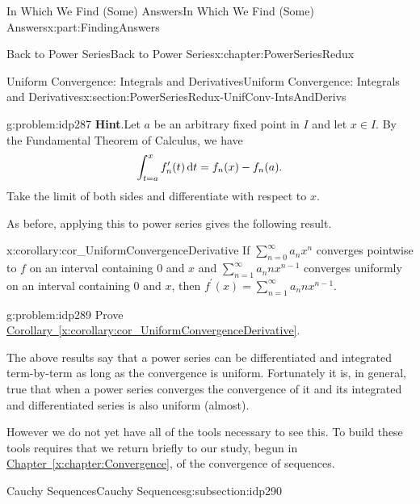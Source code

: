 \documentclass[oneside,10pt,]{book}
\newcommand{\blocktitlefont}{\relax}
\newcommand{\xreffont}{\relax}
\numberwithin{equation}{section}
\newcommand{\dx}[1]{\,{\rm d}#1}
\begin{document}
\begin{partptx}{In Which We Find (Some) Answers}{}{In Which We Find (Some) Answers}{}{}{x:part:FindingAnswers}
\begin{chapterptx}{Back to Power Series}{}{Back to Power Series}{}{}{x:chapter:PowerSeriesRedux}
\begin{sectionptx}{Uniform Convergence: Integrals and Derivatives}{}{Uniform Convergence: Integrals and Derivatives}{}{}{x:section:PowerSeriesRedux-UnifConv-IntsAndDerivs}
\begin{introduction}{}
\begin{problem}{}{g:problem:idp287}
\noindent\textbf{\blocktitlefont Hint}.\hypertarget{g:hint:idp288}{}\quad{}Let \(a\) be an arbitrary fixed point in \(I\) and let \(x\in
I\).  By the Fundamental Theorem of Calculus, we have%
\begin{equation*}
\int_{t=a}^x f^\prime_n(t)\dx{ t}=f_n(x)-f_n(a)\text{.}
\end{equation*}
Take the limit of both sides and differentiate with respect to \(x\).%
\end{problem}
As before, applying this to power series gives the following result.%
\begin{corollary}{}{}{x:corollary:cor_UniformConvergenceDerivative}%
If \(\sum_{n=0}^\infty a_nx^n\) converges pointwise to \(f\) on an interval containing \(0\) and \(x\) and \(\sum_{n=1}^\infty a_nnx^{n-1}\) converges uniformly on an interval containing \(0\) and \(x\), then \(f^\prime(x)=\sum_{n=1}^\infty a_nnx^{n-1}\).%
\end{corollary}
\begin{problem}{}{g:problem:idp289}%
 Prove \hyperref[x:corollary:cor_UniformConvergenceDerivative]{Corollary~{\xreffont\ref{x:corollary:cor_UniformConvergenceDerivative}}}.%
\end{problem}
The above results say that a power series can be differentiated and integrated term-by-term as long as the convergence is uniform. Fortunately it is, in general, true that when a power series converges the convergence of it and its integrated and differentiated series is also uniform (almost).%
\par
However we do not yet have all of the tools necessary to see this. To build these tools requires that we return briefly to our study, begun in \hyperref[x:chapter:Convergence]{Chapter~{\xreffont\ref{x:chapter:Convergence}}}, of the convergence of sequences.%
\end{introduction}%
%
%
\typeout{************************************************}
\typeout{************************************************}
%
\begin{subsectionptx}{Cauchy Sequences}{}{Cauchy Sequences}{}{}{g:subsection:idp290}

\end{subsectionptx}
\end{sectionptx}
\end{chapterptx}
\end{partptx}
\end{document}
